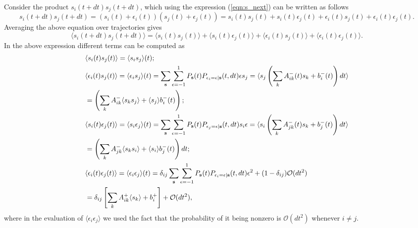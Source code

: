 \documentclass[a4paper, 11pt]{article}
\begin{document}
Consider the product $s_i(t+dt)s_j(t+dt)$, which using the expression (\ref{eqn:s_next}) can be written as follows
\begin{equation*}
  s_i(t+dt)s_j(t+dt) = (s_i(t) + \epsilon_i(t))(s_j(t) + \epsilon_j(t)) = s_i(t)s_j(t) + s_i(t)\epsilon_j(t) + \epsilon_i(t)s_j(t) + \epsilon_i(t)\epsilon_j(t).
\end{equation*}
Averaging the above equation over trajectories gives
\begin{equation*}
  \langle s_i(t+dt)s_j(t+dt)\rangle  = \langle s_i(t)s_j(t)\rangle + \langle s_i(t)\epsilon_j(t)\rangle + \langle\epsilon_i(t)s_j(t)\rangle + \langle\epsilon_i(t)\epsilon_j(t)\rangle.
\end{equation*}
In the above expression different terms can be computed as
\begin{align*}\small
  &\langle s_i(t)s_j(t)\rangle = \langle s_is_j\rangle(t);\\
  &\langle\epsilon_i(t) s_j(t)\rangle = \langle\epsilon_i s_{j}\rangle(t) = \sum_{\mathbf s}\sum_{\epsilon=-1}^1P_{\mathbf s}(t)P_{\epsilon_i=\epsilon|\mathbf s}(t,dt)\epsilon s_{j} = \langle s_{j}\left(\sum_{k}A^-_{ik}(t)s_k + b^-_i(t)\right)dt\rangle\\
  &= \left(\sum_kA^-_{ik}\langle s_ks_j\rangle + \langle s_j\rangle b^-_i(t)\right);\\
  &\langle s_i(t)\epsilon_j(t)\rangle = \langle s_i\epsilon_j\rangle(t) = \sum_{\mathbf s}\sum_{\epsilon=-1}^1P_{\mathbf s}(t)P_{\epsilon_j=\epsilon|\mathbf s}(t,dt)s_i\epsilon = \langle s_i\left(\sum_{k}A^-_{jk}(t)s_k + b^-_j(t)\right)dt\rangle\\
  &= \left(\sum_kA^-_{jk}\langle s_ks_i\rangle + \langle s_i\rangle b^-_j(t)\right)dt;\\
  &\langle\epsilon_i(t)\epsilon_j(t)\rangle = \langle\epsilon_i\epsilon_j\rangle(t) = \delta_{ij}\sum_{\mathbf s}\sum_{\epsilon=-1}^1P_{\mathbf s}(t)P_{\epsilon_i=\epsilon|\mathbf s}(t,dt)\epsilon^2 + (1-\delta_{ij})\mathcal O(dt^2)\\
  & = \delta_{ij}\left[\sum_kA^+_{ik}\langle s_k\rangle + b^+_i\right] + \mathcal O(dt^2),
\end{align*}
where in the evaluation of $\langle\epsilon_i\epsilon_j\rangle$ we used the fact that the probability of it being nonzero is $\mathcal O(dt^2)$ whenever $i\neq j$.
\end{document}
